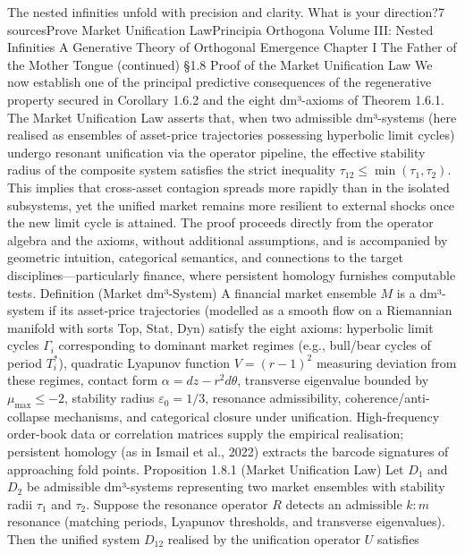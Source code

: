 The nested infinities unfold with precision and clarity. What is your direction?7 sourcesProve Market Unification LawPrincipia Orthogona
Volume III: Nested Infinities
A Generative Theory of Orthogonal Emergence
Chapter I
The Father of the Mother Tongue
(continued)
§1.8 Proof of the Market Unification Law
We now establish one of the principal predictive consequences of the regenerative property secured in Corollary 1.6.2 and the eight dm³-axioms of Theorem 1.6.1. The Market Unification Law asserts that, when two admissible dm³-systems (here realised as ensembles of asset-price trajectories possessing hyperbolic limit cycles) undergo resonant unification via the operator pipeline, the effective stability radius of the composite system satisfies the strict inequality $  \tau_{12} \le \min(\tau_1, \tau_2)  $. This implies that cross-asset contagion spreads more rapidly than in the isolated subsystems, yet the unified market remains more resilient to external shocks once the new limit cycle is attained. The proof proceeds directly from the operator algebra and the axioms, without additional assumptions, and is accompanied by geometric intuition, categorical semantics, and connections to the target disciplines—particularly finance, where persistent homology furnishes computable tests.
Definition (Market dm³-System)
A financial market ensemble $  M  $ is a dm³-system if its asset-price trajectories (modelled as a smooth flow on a Riemannian manifold with sorts Top, Stat, Dyn) satisfy the eight axioms: hyperbolic limit cycles $  \Gamma_i  $ corresponding to dominant market regimes (e.g., bull/bear cycles of period $  T_i^*  $), quadratic Lyapunov function $  V = (r-1)^2  $ measuring deviation from these regimes, contact form $  \alpha = dz - r^2 d\theta  $, transverse eigenvalue bounded by $  \mu_{\max} \le -2  $, stability radius $  \varepsilon_0 = 1/3  $, resonance admissibility, coherence/anti-collapse mechanisms, and categorical closure under unification. High-frequency order-book data or correlation matrices supply the empirical realisation; persistent homology (as in Ismail et al., 2022) extracts the barcode signatures of approaching fold points.
Proposition 1.8.1 (Market Unification Law)
Let $  D_1  $ and $  D_2  $ be admissible dm³-systems representing two market ensembles with stability radii $  \tau_1  $ and $  \tau_2  $. Suppose the resonance operator $  R  $ detects an admissible $  k:m  $ resonance (matching periods, Lyapunov thresholds, and transverse eigenvalues). Then the unified system $  D_{12}  $ realised by the unification operator $  U  $ satisfies
